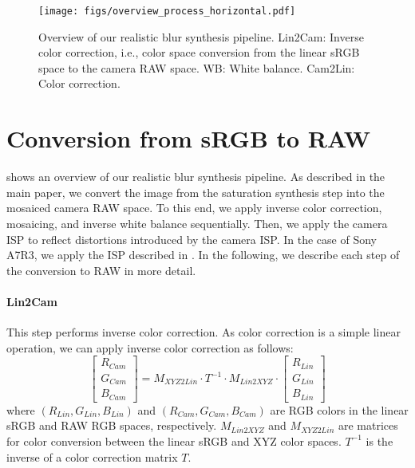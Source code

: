\begin{figure}[!t]
\centering
\texttt{[image: figs/overview\_process\_horizontal.pdf]}
\vspace{-0.35cm}
\caption{Overview of our realistic blur synthesis pipeline. Lin2Cam: Inverse color correction, i.e., color space conversion from the linear sRGB space to the camera RAW space. WB: White balance. Cam2Lin: Color correction.}
\vspace{-0.25cm}
\label{fig:generation_process_supple}
\end{figure}




\section{Conversion from sRGB to RAW}

 shows an overview of our realistic blur synthesis pipeline.
As described in the main paper, we convert the image from the saturation synthesis step into the mosaiced camera RAW space.
To this end, we apply inverse color correction, mosaicing, and inverse white balance sequentially.
Then, we apply the camera ISP to reflect distortions introduced by the camera ISP.
In the case of Sony A7R3, we apply the ISP described in .
In the following, we describe each step of the conversion to RAW in more detail.

\paragraph{Lin2Cam}
This step performs inverse color correction.
As color correction is a simple linear operation, we can apply inverse color correction as follows:
\begin{equation}
    \begin{bmatrix} R_{Cam} \\ G_{Cam} \\ B_{Cam} \end{bmatrix} = M_{XYZ2Lin} \cdot T^{-1} \cdot M_{Lin2XYZ} \cdot \begin{bmatrix} R_{Lin} \\ G_{Lin} \\ B_{Lin} \end{bmatrix}  \label{eq:lin2cam}
\end{equation}
where $(R_{Lin}, G_{Lin}, B_{Lin})$ and $(R_{Cam}, G_{Cam}, B_{Cam})$ are RGB colors in the linear sRGB and RAW RGB spaces, respectively.
$M_{Lin2XYZ}$ and $M_{XYZ2Lin}$ are matrices for color conversion between the linear sRGB and XYZ color spaces. $T^{-1}$ is the inverse of a color correction matrix $T$. 


